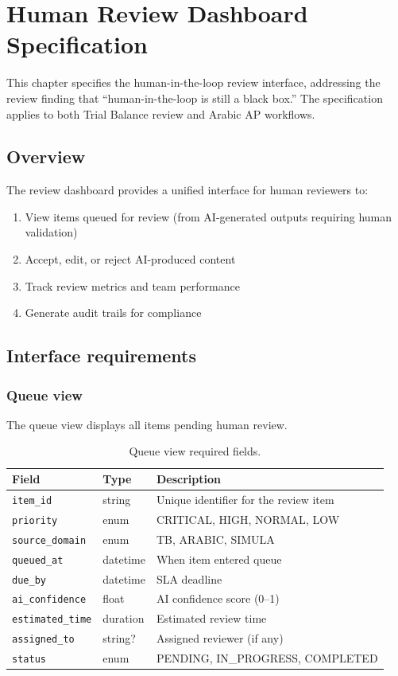 \chapter{Human Review Dashboard Specification}\label{ch:review-dashboard}

This chapter specifies the human-in-the-loop review interface, addressing the
review finding that ``human-in-the-loop is still a black box.'' The
specification applies to both Trial Balance review and Arabic AP workflows.

\section{Overview}

The review dashboard provides a unified interface for human reviewers to:

\begin{enumerate}
  \item View items queued for review (from AI-generated outputs requiring
        human validation)
  \item Accept, edit, or reject AI-produced content
  \item Track review metrics and team performance
  \item Generate audit trails for compliance
\end{enumerate}

\section{Interface requirements}

\subsection{Queue view}

The queue view displays all items pending human review.

\begin{table}[htbp]
\centering
\caption{Queue view required fields.}
\label{tab:queue-fields}
\footnotesize
\begin{tabularx}{\linewidth}{@{}l l X@{}}
\toprule
\textbf{Field} & \textbf{Type} & \textbf{Description} \\ \midrule
\texttt{item\_id} & string & Unique identifier for the review item \\
\texttt{priority} & enum & CRITICAL, HIGH, NORMAL, LOW \\
\texttt{source\_domain} & enum & TB, ARABIC, SIMULA \\
\texttt{queued\_at} & datetime & When item entered queue \\
\texttt{due\_by} & datetime & SLA deadline \\
\texttt{ai\_confidence} & float & AI confidence score (0--1) \\
\texttt{estimated\_time} & duration & Estimated review time \\
\texttt{assigned\_to} & string? & Assigned reviewer (if any) \\
\texttt{status} & enum & PENDING, IN\_PROGRESS, COMPLETED \\
\bottomrule
\end{tabularx}
\end{table}


